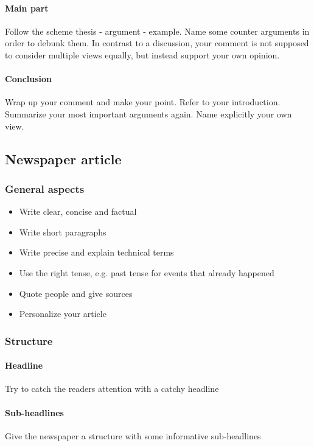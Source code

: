 \documentclass{article}
\begin{document}
	\paragraph{Main part}
	Follow the scheme thesis - argument - example. Name some counter arguments in order to debunk them. In contrast to a discussion, your comment is not supposed to consider multiple views equally, but instead support your own opinion.

	\paragraph{Conclusion}
	Wrap up your comment and make your point. Refer to your introduction. Summarize your most important arguments again. Name explicitly your own view.

	\subsection{Newspaper article}
	\subsubsection{General aspects}
	\begin{itemize}
		\item Write clear, concise and factual
		\item Write short paragraphs
		\item Write precise and explain technical terms
		\item Use the right tense, e.g. past tense for events that already happened
		\item Quote people and give sources 
		\item Personalize your article
	\end{itemize}

	\subsubsection{Structure}
	\paragraph{Headline}
	Try to catch the readers attention with a catchy headline
	
	\paragraph{Sub-headlines}
	Give the newspaper a structure with some informative sub-headlines
\end{document}
